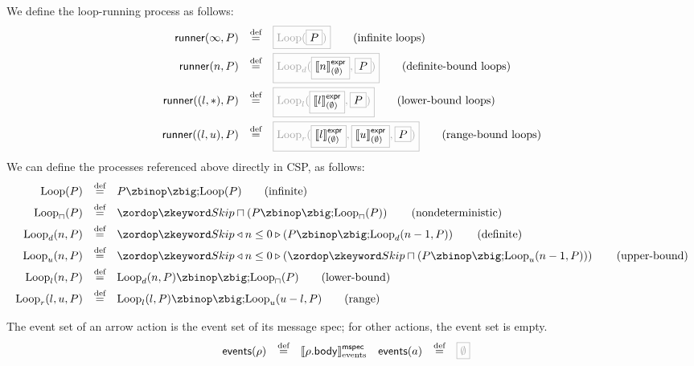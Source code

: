 \newcommand{\iloop}[1]{\text{Loop}(#1)}
\newcommand{\nloop}[1]{\text{Loop}_\sqcap(#1)}
\newcommand{\dloop}[2]{\text{Loop}_d(#1, #2)}
\newcommand{\lloop}[2]{\text{Loop}_l(#1, #2)}
\newcommand{\uloop}[2]{\text{Loop}_u(#1, #2)}
\newcommand{\rloop}[3]{\text{Loop}_r(#1, #2, #3)}

\begin{definition}
We define the loop-running process as follows:
%
\begin{align*}
  \funcname{runner}(\infty, P)
  \quad\defeq\quad
  & \tlang{\iloop{\olang{P}}}
    \tag{infinite loops}
  \\
  \funcname{runner}(n, P)
  \quad\defeq\quad
  & \tlang{\dloop{\olang{\exprsema{n}{\emptyset}}}{\olang{P}}}
    \tag{definite-bound loops}
  \\
  \funcname{runner}((l, \ast), P)
  \quad\defeq\quad
  & \tlang{\lloop{\olang{\exprsema{l}{\emptyset}}}{\olang{P}}}
    \tag{lower-bound loops}
  \\
  \funcname{runner}((l, u), P)
  \quad\defeq\quad
  & \tlang{\rloop{\olang{\exprsema{l}{\emptyset}}}{\olang{\exprsema{u}{\emptyset}}}{\olang{P}}}
    \tag{range-bound loops}
  \\  
\end{align*}
%
We can define the processes referenced above directly in CSP, as follows:
%
\begin{align*}
  \iloop{P}
  \quad\defeq\quad
  & P \circseq \iloop{P}
    \tag{infinite}
  \\
  \nloop{P}
  \quad\defeq\quad
  & \Skip \sqcap \left(P \circseq \nloop{P}\right)
    \tag{nondeterministic}
  \\  
  \dloop{n}{P}
  \quad\defeq\quad
  & \Skip \triangleleft n \leq 0 \triangleright \left(P \circseq \dloop{n-1}{P}\right)
    \tag{definite}
  \\
  \uloop{n}{P}
  \quad\defeq\quad
  & \Skip \triangleleft n \leq 0 \triangleright \left(\Skip \sqcap \left(P \circseq \uloop{n-1}{P}\right)\right)
    \tag{upper-bound}
  \\
  \lloop{n}{P}
  \quad\defeq\quad
  & \dloop{n}{P} \circseq \nloop{P}
    \tag{lower-bound}
  \\
  \rloop{l}{u}{P}
  \quad\defeq\quad
  & \lloop{l}{P} \circseq \uloop{u - l}{P}
    \tag{range}
  \\
\end{align*}
\end{definition}

\begin{definition}
  The event set of an arrow action is the event set of its message spec; for
  other actions, the event set is empty.
%
  \begin{align*}
    \eventsOf{\anarrow}
    \quad\defeq\quad
    &
      \emspecsema{\field{\anarrow}{body}}
    &
      \eventsOf{\anaction}
      \quad\defeq\quad
    &
      \tlang{\emptyset}
  \end{align*}
\end{definition}


